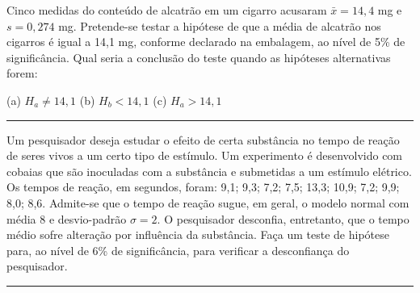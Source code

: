 \documentclass[a4paper,11pt,fleqn]{article}\usepackage[]{graphicx}\usepackage[]{color}
\theoremstyle{definition}
\begin{document}
\begin{compactenum}[18.] %
\item Cinco medidas do conteúdo de alcatrão em um cigarro acusaram
  $\bar{x} = 14,4$ mg e $s = 0,274$ mg. Pretende-se testar a hipótese de
  que a média de alcatrão nos cigarros é igual a 14,1 mg, conforme
  declarado na embalagem, ao nível de 5\% de significância. Qual seria a
  conclusão do teste quando as hipóteses alternativas forem:
  \begin{compactenum}
  \item[] (a) $H_a \neq 14,1$ \qquad (b) $H_b < 14,1$ \qquad (c) $H_a > 14,1$
  \end{compactenum}
\end{compactenum}

\vspace{0.3cm}
\hrule
\vspace{0.3cm}

\begin{compactenum}[19.] %
\item Um pesquisador deseja estudar o efeito de certa substância no
  tempo de reação de seres vivos a um certo tipo de estímulo. Um
  experimento é desenvolvido com cobaias que são inoculadas com a
  substância e submetidas a um estímulo elétrico. Os tempos de reação,
  em segundos, foram: 9,1; 9,3; 7,2; 7,5; 13,3; 10,9; 7,2; 9,9; 8,0;
  8,6. Admite-se que o tempo de reação sugue, em geral, o modelo normal
  com média 8 e desvio-padrão $\sigma = 2$. O pesquisador desconfia,
  entretanto, que o tempo médio sofre alteração por influência da
  substância. Faça um teste de hipótese para, ao nível de 6\% de
  significância, para verificar a desconfiança do pesquisador.
\end{compactenum}

\vspace{0.3cm}
\hrule
\vspace{0.3cm}
\end{document}
